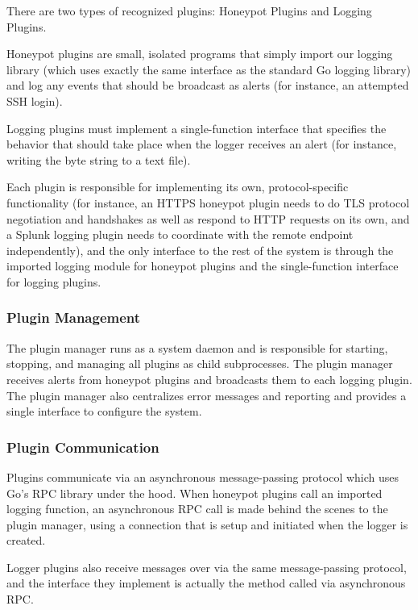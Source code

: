 There are two types of recognized plugins: Honeypot Plugins and Logging Plugins.

Honeypot plugins are small, isolated programs that simply import our logging library
(which uses exactly the same interface as the standard Go logging library)
and log any events that should be broadcast as alerts (for instance, an
attempted SSH login).

Logging plugins must implement a single-function interface that specifies the
behavior that should take place when the logger receives an alert (for instance,
writing the byte string to a text file).

Each plugin is responsible for implementing its own, protocol-specific functionality
(for instance, an HTTPS honeypot plugin needs to do TLS protocol negotiation and handshakes
as well as respond to HTTP requests on its own, and a Splunk logging plugin needs
to coordinate with the remote endpoint independently), and the only interface to
the rest of the system is through the imported logging module for honeypot
plugins and the single-function interface for logging plugins.

\subsubsection{Plugin Management}

The plugin manager runs as a system daemon and is responsible for starting,
stopping, and managing all plugins as child subprocesses.
The plugin manager receives alerts from honeypot plugins and broadcasts them to
each logging plugin. The plugin manager also centralizes error messages and
reporting and provides a single interface to configure the system.

\subsubsection{Plugin Communication}

Plugins communicate via an asynchronous message-passing protocol which uses
Go's RPC library under the hood. When honeypot plugins call an imported logging
function, an asynchronous RPC call is made behind the scenes to the plugin
manager, using a connection that is setup and initiated when the logger is
created.

Logger plugins also receive messages over via the same message-passing protocol,
and the interface they implement is actually the method called via asynchronous
RPC.

